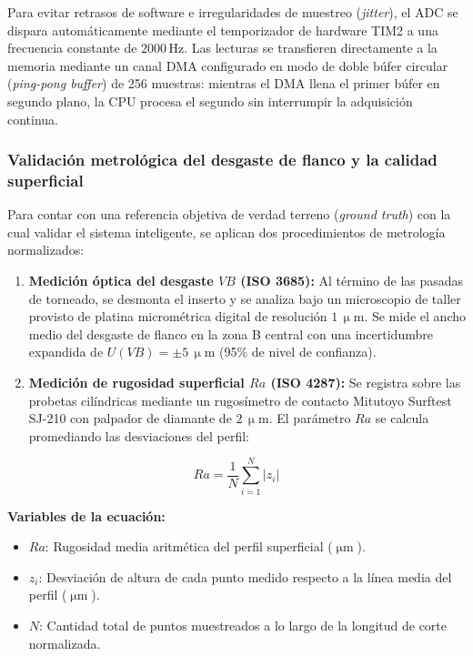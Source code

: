 Para evitar retrasos de software e irregularidades de muestreo (\textit{jitter}), el ADC se dispara automáticamente mediante el temporizador de hardware TIM2 a una frecuencia constante de $2000\,\text{Hz}$. Las lecturas se transfieren directamente a la memoria mediante un canal DMA configurado en modo de doble búfer circular (\textit{ping-pong buffer}) de 256 muestras: mientras el DMA llena el primer búfer en segundo plano, la CPU procesa el segundo sin interrumpir la adquisición continua.

\subsubsection{Validación metrológica del desgaste de flanco y la calidad superficial}

Para contar con una referencia objetiva de verdad terreno (\textit{ground truth}) con la cual validar el sistema inteligente, se aplican dos procedimientos de metrología normalizados:
\begin{enumerate}
    \item \textbf{Medición óptica del desgaste $VB$ (ISO 3685):} Al término de las pasadas de torneado, se desmonta el inserto y se analiza bajo un microscopio de taller provisto de platina micrométrica digital de resolución $1\,\upmu\text{m}$. Se mide el ancho medio del desgaste de flanco en la zona B central con una incertidumbre expandida de $U(VB) = \pm 5\,\upmu\text{m}$ (95\% de nivel de confianza).
    \item \textbf{Medición de rugosidad superficial $Ra$ (ISO 4287):} Se registra sobre las probetas cilíndricas mediante un rugosímetro de contacto Mitutoyo Surftest SJ-210 con palpador de diamante de $2\,\upmu\text{m}$. El parámetro $Ra$ se calcula promediando las desviaciones del perfil:
\end{enumerate}

\begin{equation}
Ra = \frac{1}{N} \sum_{i=1}^{N} |z_i|
\label{eq:rugosidad_ra}
\end{equation}

\noindent\textbf{Variables de la ecuación:}
\begin{itemize}
    \item $Ra$: Rugosidad media aritmética del perfil superficial ($\upmu\text{m}$).
    \item $z_i$: Desviación de altura de cada punto medido respecto a la línea media del perfil ($\upmu\text{m}$).
    \item $N$: Cantidad total de puntos muestreados a lo largo de la longitud de corte normalizada.
\end{itemize}


